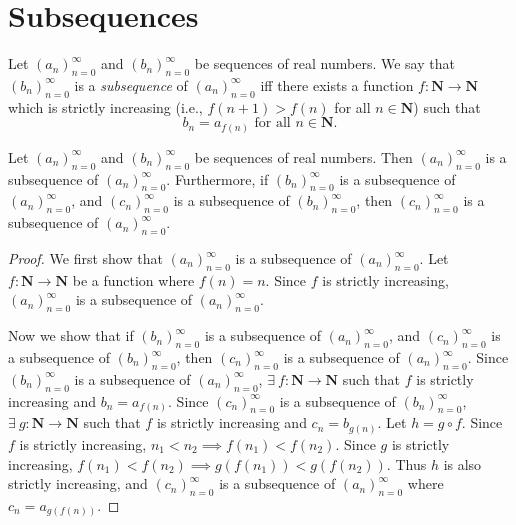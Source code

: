 \section{Subsequences}\label{sec 6.6}

\begin{definition}[Subsequences]\label{6.6.1}
Let \((a_n)_{n = 0}^\infty\) and \((b_n)_{n = 0}^\infty\) be sequences of real numbers.
We say that \((b_n)_{n = 0}^\infty\) is a \emph{subsequence} of \((a_n)_{n = 0}^\infty\) iff there exists a function \(f : \mathbf{N} \to \mathbf{N}\) which is strictly increasing (i.e., \(f(n + 1) > f(n)\) for all \(n \in \mathbf{N}\)) such that
\[
    b_n = a_{f(n)} \text{ for all } n \in \mathbf{N}.
\]
\end{definition}

\setcounter{theorem}{3}
\begin{lemma}\label{6.6.4}
Let \((a_n)_{n = 0}^\infty\) and \((b_n)_{n = 0}^\infty\) be sequences of real numbers.
Then \((a_n)_{n = 0}^\infty\) is a subsequence of \((a_n)_{n = 0}^\infty\).
Furthermore, if \((b_n)_{n = 0}^\infty\) is a subsequence of \((a_n)_{n = 0}^\infty\), and \((c_n)_{n = 0}^\infty\) is a subsequence of \((b_n)_{n = 0}^\infty\), then \((c_n)_{n = 0}^\infty\) is a subsequence of \((a_n)_{n = 0}^\infty\).
\end{lemma}

\begin{proof}
We first show that \((a_n)_{n = 0}^\infty\) is a subsequence of \((a_n)_{n = 0}^\infty\).
Let \(f : \mathbf{N} \to \mathbf{N}\) be a function where \(f(n) = n\).
Since \(f\) is strictly increasing, \((a_n)_{n = 0}^\infty\) is a subsequence of \((a_n)_{n = 0}^\infty\).

Now we show that if \((b_n)_{n = 0}^\infty\) is a subsequence of \((a_n)_{n = 0}^\infty\), and \((c_n)_{n = 0}^\infty\) is a subsequence of \((b_n)_{n = 0}^\infty\), then \((c_n)_{n = 0}^\infty\) is a subsequence of \((a_n)_{n = 0}^\infty\).
Since \((b_n)_{n = 0}^\infty\) is a subsequence of \((a_n)_{n = 0}^\infty\), \(\exists\ f : \mathbf{N} \to \mathbf{N}\) such that \(f\) is strictly increasing and \(b_n = a_{f(n)}\).
Since \((c_n)_{n = 0}^\infty\) is a subsequence of \((b_n)_{n = 0}^\infty\), \(\exists\ g : \mathbf{N} \to \mathbf{N}\) such that \(f\) is strictly increasing and \(c_n = b_{g(n)}\).
Let \(h = g \circ f\).
Since \(f\) is strictly increasing, \(n_1 < n_2 \implies f(n_1) < f(n_2)\).
Since \(g\) is strictly increasing, \(f(n_1) < f(n_2) \implies g(f(n_1)) < g(f(n_2))\).
Thus \(h\) is also strictly increasing, and \((c_n)_{n = 0}^\infty\) is a subsequence of \((a_n)_{n = 0}^\infty\) where \(c_n = a_{g(f(n))}\).
\end{proof}


